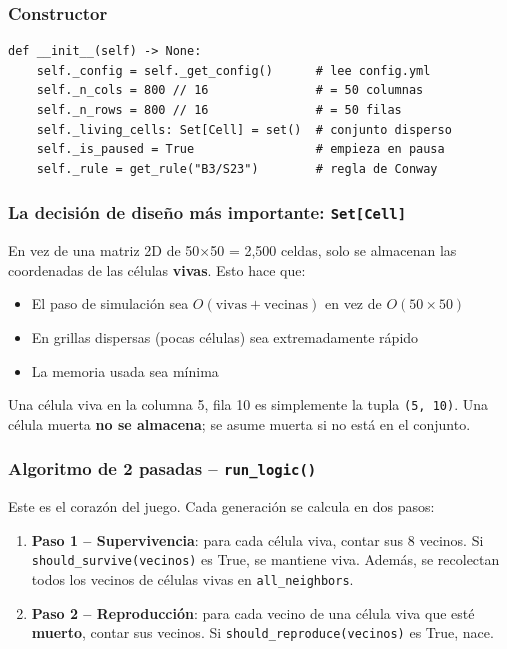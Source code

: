 \documentclass[12pt,a4paper]{article}
\begin{document}
\subsubsection{Constructor}

\begin{lstlisting}
def __init__(self) -> None:
    self._config = self._get_config()      # lee config.yml
    self._n_cols = 800 // 16               # = 50 columnas
    self._n_rows = 800 // 16               # = 50 filas
    self._living_cells: Set[Cell] = set()  # conjunto disperso
    self._is_paused = True                 # empieza en pausa
    self._rule = get_rule("B3/S23")        # regla de Conway
\end{lstlisting}

\subsubsection{La decisión de diseño más importante: \texttt{Set[Cell]}}

En vez de una matriz 2D de 50$\times$50 = 2,500 celdas, solo se almacenan
las coordenadas de las células \textbf{vivas}. Esto hace que:

\begin{itemize}
  \item El paso de simulación sea $O(\text{vivas} + \text{vecinas})$ en vez de $O(50 \times 50)$
  \item En grillas dispersas (pocas células) sea extremadamente rápido
  \item La memoria usada sea mínima
\end{itemize}

Una célula viva en la columna 5, fila 10 es simplemente la tupla \texttt{(5, 10)}.
Una célula muerta \textbf{no se almacena}; se asume muerta si no está en el conjunto.

\subsubsection{Algoritmo de 2 pasadas -- \texttt{run\_logic()}}

Este es el corazón del juego. Cada generación se calcula en dos pasos:

\begin{enumerate}
  \item \textbf{Paso 1 -- Supervivencia}: para cada célula viva, contar sus 8 vecinos.
        Si \texttt{should\_survive(vecinos)} es True, se mantiene viva.
        Además, se recolectan todos los vecinos de células vivas en \texttt{all\_neighbors}.

  \item \textbf{Paso 2 -- Reproducción}: para cada vecino de una célula viva que esté
        \textbf{muerto}, contar sus vecinos. Si \texttt{should\_reproduce(vecinos)} es True, nace.
\end{enumerate}
\end{document}
